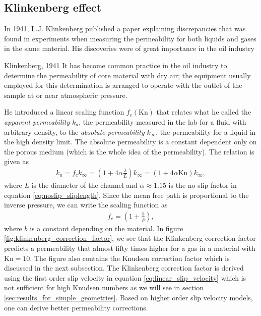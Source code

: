 \subsection{Klinkenberg effect}
In 1941, L.J. Klinkenberg published a paper explaining discrepancies that was found in experiments when measuring the permeability for both liquids and gases in the same material\cite{klinkenberg1941permeability}. His discoveries were of great importance in the oil industry
\begin{aquote}{Klinkenberg, 1941}
	It has become common practice in the oil industry to determine the permeability of core material with dry air; the equipment usually employed for this determination is arranged to operate with the outlet of the sample at or near atmospheric pressure.
\end{aquote}
He introduced a linear scaling function $f_c(\text{Kn})$ that relates what he called the \textit{apparent permeability} $k_a$, the permeability measured in the lab for a fluid with arbitrary density, to the \textit{absolute permeability} $k_\infty$, the permeability for a liquid in the high density limit. The absolute permeability is a constant dependent only on the porous medium (which is the whole idea of the permeability). The relation is given as
\begin{align}
	k_a = f_c k_\infty = \left(1 + 4\alpha\frac{\lambda}{L}\right)k_\infty = \left(1 + 4\alpha\text{Kn}\right)k_\infty,
\end{align}
where $L$ is the diameter of the channel and $\alpha\approx 1.15$ is the no-slip factor in equation \eqref{eq:noslip_sliplength}. Since the mean free path is proportional to the inverse pressure, we can write the scaling function as
\begin{align}
	f_c = \left(1 + \frac{b}{\bar P}\right),
\end{align}
where $b$ is a constant depending on the material. In figure \ref{fig:klinkenberg_correction_factor}, we see that the Klinkenberg correction factor predicts a permeability that almost fifty times higher for a gas in a material with $\text{Kn}=10$. The figure also contains the Knudsen correction factor which is discussed in the next subsection. The Klinkenberg correction factor is derived using the first order slip velocity in equation \eqref{eq:linear_slip_velocity} which is not sufficient for high Knudsen numbers as we will see in section \ref{sec:results_for_simple_geometries}. Based on higher order slip velocity models, one can derive better permeability corrections. 
